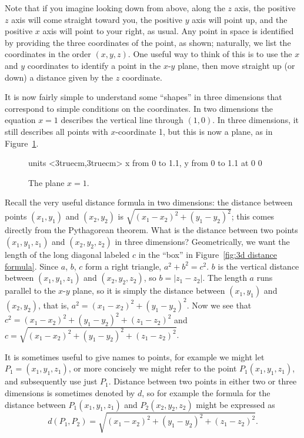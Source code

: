 Note that if you imagine looking down from above, along the $z$ axis,
the positive $z$ axis will come straight toward you, the positive $y$
axis will point up, and the positive $x$ axis will point to your
right, as usual. Any point in space is identified by providing the
three coordinates of the point, as shown; naturally, we list the
coordinates in the order $(x,y,z)$. One useful way to think of
this is to use the $x$ and $y$ coordinates to identify a point in the
$x$-$y$ plane, then move straight up (or down) a distance given by
the $z$ coordinate.

It is now fairly simple to understand some ``shapes'' in three
dimensions that correspond to simple conditions on the coordinates. In
two dimensions the equation $x=1$ describes the vertical line through
$(1,0)$. In three dimensions, it still describes all points with
$x$-coordinate 1, but this is now a plane, as in
Figure~\ref{fig:plane}.

\begin{figure}[H]
\centerline{
\vbox{\beginpicture
\normalgraphs
\setcoordinatesystem units <3truecm,3truecm>
\setplotarea x from 0 to 1.1, y from 0 to 1.1
 at 0 0
\endpicture}}
\caption{The plane $x=1$. \label{fig:plane}}
\end{figure}

Recall the very useful distance formula in two dimensions: the
distance between points $(x_1,y_1)$ and $(x_2,y_2)$ is
$\sqrt{(x_1-x_2)^2+(y_1-y_2)^2}$; this comes directly from the
Pythagorean theorem. What is the distance between two points
$(x_1,y_1,z_1)$ and $(x_2,y_2,z_2)$ in three dimensions?
Geometrically, we want the length of the long diagonal labeled $c$ in
the ``box'' in Figure~\ref{fig:3d distance formula}. Since $a$,
$b$, $c$ form a right triangle, $a^2+b^2=c^2$. $b$ is the vertical
distance between $(x_1,y_1,z_1)$ and $(x_2,y_2,z_2)$, so
$b=|z_1-z_2|$.  The length $a$ runs parallel to the $x$-$y$ plane, so
it is simply the distance between $(x_1,y_1)$ and $(x_2,y_2)$, that
is, $a^2=(x_1-x_2)^2+(y_1-y_2)^2$. Now we see that
$c^2=(x_1-x_2)^2+(y_1-y_2)^2+(z_1-z_2)^2$ and
$c=\sqrt{(x_1-x_2)^2+(y_1-y_2)^2+(z_1-z_2)^2}$. 

It is sometimes useful to give names to points, for example we might
let $P_1=(x_1,y_1,z_1)$, or more concisely we might refer to the point
$P_1(x_1,y_1,z_1)$, and subsequently use just $P_1$. Distance between
two points in either two or three dimensions is sometimes denoted by
$d$, so for example the formula for the distance between $P_1(x_1,y_1,z_1)$
and $P_2(x_2,y_2,z_2)$ might be expressed as
$$d(P_1,P_2)=\sqrt{(x_1-x_2)^2+(y_1-y_2)^2+(z_1-z_2)^2}.$$

